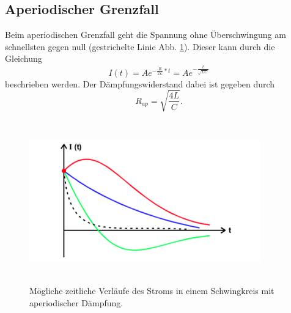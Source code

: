 \subsection{Aperiodischer Grenzfall}
Beim aperiodischen Grenzfall geht die Spannung ohne Überschwingung am schnellsten gegen null
(gestrichelte Linie Abb. \ref{fig:ap_gr}). Dieser kann durch die Gleichung
\begin{equation} 
    I(t)=A e^{-\frac{R}{2L}*t}= A e^{-\frac{t}{\sqrt{LC}}}
\end{equation}
beschrieben werden.
Der Dämpfungswiderstand dabei ist gegeben durch
\begin{equation}
    R_{ap} = \sqrt{\frac{4L}{C}}.
    \label{eqn:r_ap}
\end{equation}
\begin{figure}
  \centering
  \includegraphics[width= 10cm, height= 7cm]{build/ap_grenzfall.png}
  \caption{Mögliche zeitliche Verläufe des Stroms in einem Schwingkreis mit aperiodischer Dämpfung.}
  \label{fig:ap_gr}
\end{figure}

